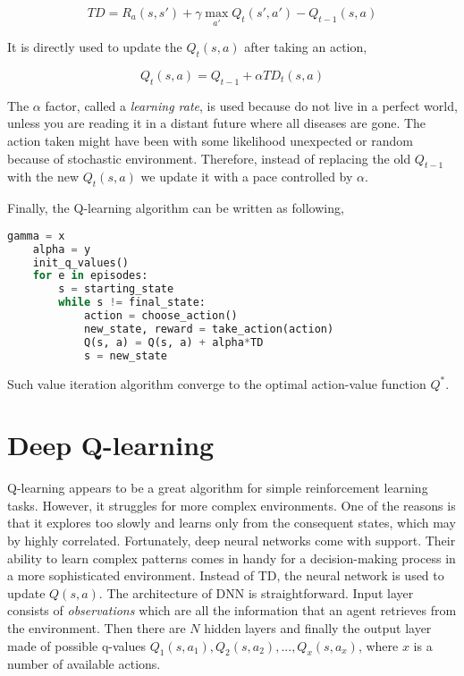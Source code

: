 \begin{equation}
    TD = R_a(s, s') + \gamma \max_{a'} Q_{t}(s', a') - Q_{t-1}(s, a)
\label{eq:temporal-difference}
\end{equation}

It is directly used to update the $Q_t(s, a)$ after taking an action,

\begin{equation}
    Q_t(s, a) = Q_{t-1} + \alpha TD_t(s, a)
\end{equation}

The $\alpha$ factor, called a \emph{learning rate}, is used because do not live in a perfect world, unless you are reading it in a distant future where all diseases are gone. The action taken might have been with some likelihood unexpected or random because of stochastic environment. Therefore, instead of replacing the old $Q_{t-1}$ with the new $Q_t(s, a)$ we update it with a pace controlled by $\alpha$.

\vspace{.5cm}

Finally, the Q-learning algorithm can be written as following,

\begin{lstlisting}[language=Python, caption={Q-learning algorithm}]
    gamma = x
    alpha = y
    init_q_values()
    for e in episodes:
        s = starting_state
        while s != final_state:
            action = choose_action()
            new_state, reward = take_action(action)
            Q(s, a) = Q(s, a) + alpha*TD
            s = new_state
\end{lstlisting}

Such value iteration algorithm converge to the optimal action-value function $Q^*$.

\section{Deep Q-learning}
\label{sec:deep-q-learn}

Q-learning appears to be a great algorithm for simple reinforcement learning tasks. However, it struggles for more complex environments. One of the reasons is that it explores too slowly and learns only from the consequent states, which may by highly correlated. Fortunately, deep neural networks come with support. Their ability to learn complex patterns comes in handy for a decision-making process in a more sophisticated environment. Instead of TD, the neural network is used to update $Q(s, a)$. The architecture of DNN is straightforward. Input layer consists of \emph{observations} which are all the information that an agent retrieves from the environment. Then there are $N$ hidden layers and finally the output layer made of possible q-values $Q_1(s, a_1), Q_2(s, a_2), ..., Q_x(s, a_x)$, where $x$ is a number of available actions.

